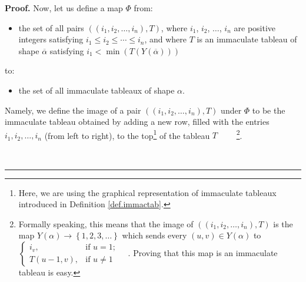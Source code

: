 \documentclass[numbers=enddot,12pt,final,onecolumn,notitlepage,abstracton]{scrartcl}%
\theoremstyle{definition}
\newenvironment{proof}[1][Proof]{\noindent\textbf{#1.} }{\ \rule{0.5em}{0.5em}}
\begin{document}
\begin{proof}
Now, let us define a map $\Phi$ from:

\begin{itemize}
\item the set of all pairs $\left(  \left(  i_{1},i_{2},\ldots,i_{n}\right)
,T\right)  $, where $i_{1}$, $i_{2}$, $\ldots$, $i_{n}$ are positive integers
satisfying $i_{1}\leq i_{2}\leq\cdots\leq i_{n}$, and where $T$ is an
immaculate tableau of shape $\overline{\alpha}$ satisfying $i_{1}<\min\left(
T\left(  Y\left(  \overline{\alpha}\right)  \right)  \right)  $
\end{itemize}

to:

\begin{itemize}
\item the set of all immaculate tableaux of shape $\alpha$.
\end{itemize}

Namely, we define the image of a pair $\left(  \left(  i_{1},i_{2}%
,\ldots,i_{n}\right)  ,T\right)  $ under $\Phi$ to be the immaculate tableau
obtained by adding a new row, filled with the entries $i_{1},i_{2}%
,\ldots,i_{n}$ (from left to right), to the top\footnote{Here, we are using
the graphical representation of immaculate tableaux introduced in Definition
\ref{def.immactab}.} of the tableau $T$ \ \ \ \ \footnote{Formally speaking,
this means that the image of $\left(  \left(  i_{1},i_{2},\ldots,i_{n}\right)
,T\right)  $ is the map $Y\left(  \alpha\right)  \rightarrow\left\{
1,2,3,\ldots\right\}  $ which sends every $\left(  u,v\right)  \in Y\left(
\alpha\right)  $ to $%
\begin{cases}
i_{v}, & \text{if }u=1;\\
T\left(  u-1,v\right)  , & \text{if }u\neq1
\end{cases}
\quad$. Proving that this map is an immaculate tableau is easy.}.


\end{proof}
\end{document}
